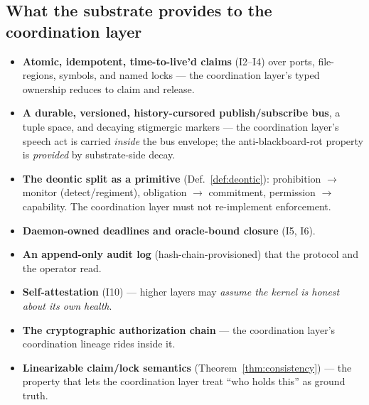\documentclass[11pt,a4paper]{article}
\theoremstyle{definition}
\theoremstyle{remark}
\begin{document}
\subsection{What the substrate provides to the coordination layer}
\begin{itemize}[leftmargin=1.4em]
  \item \textbf{Atomic, idempotent, time-to-live'd claims} (I2--I4) over ports,
  file-regions, symbols, and named locks --- the coordination layer's typed
  ownership reduces to claim and release.
  \item \textbf{A durable, versioned, history-cursored publish/subscribe bus}, a
  tuple space, and decaying stigmergic markers --- the coordination layer's speech
  act is carried \emph{inside} the bus envelope; the anti-blackboard-rot property is
  \emph{provided} by substrate-side decay.
  \item \textbf{The deontic split as a primitive} (Def.~\ref{def:deontic}):
  prohibition $\to$ monitor (detect/regiment), obligation $\to$ commitment,
  permission $\to$ capability. The coordination layer must not re-implement
  enforcement.
  \item \textbf{Daemon-owned deadlines and oracle-bound closure} (I5, I6).
  \item \textbf{An append-only audit log} (hash-chain-provisioned) that the protocol
  and the operator read.
  \item \textbf{Self-attestation} (I10) --- higher layers may \emph{assume the
  kernel is honest about its own health}.
  \item \textbf{The cryptographic authorization chain} --- the coordination layer's
  coordination lineage rides inside it.
  \item \textbf{Linearizable claim/lock semantics} (Theorem~\ref{thm:consistency})
  --- the property that lets the coordination layer treat ``who holds this'' as
  ground truth.
\end{itemize}
\end{document}
